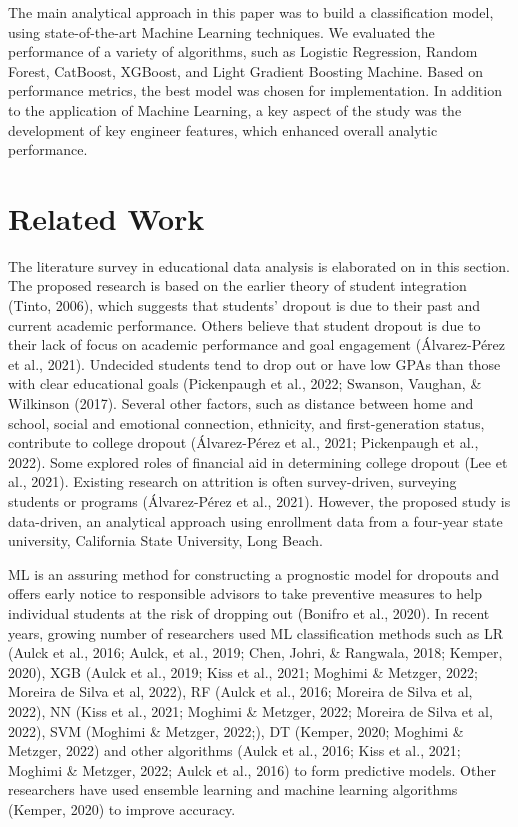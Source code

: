\documentclass[notitlepage,12pt]{jedm}
\begin{document}
\par The main analytical approach in this paper was to build a classification model, using state-of-the-art Machine Learning techniques. We evaluated the performance of a variety of algorithms, such as Logistic Regression, Random Forest, CatBoost, XGBoost, and Light Gradient Boosting Machine. Based on performance metrics, the best model was chosen for implementation. In addition to the application of Machine Learning, a key aspect of the study was the development of key engineer features, which enhanced overall analytic performance.    

\section{Related Work}

\par The literature survey in educational data analysis is elaborated on in this section.  The proposed research is based on the earlier theory of student integration (Tinto, 2006), which suggests that students’ dropout is due to their past and current academic performance.  Others believe that student dropout is due to their lack of focus on academic performance and goal engagement (Álvarez-Pérez et al., 2021).  Undecided students tend to drop out or have low GPAs than those with clear educational goals (Pickenpaugh et al., 2022; Swanson, Vaughan, \& Wilkinson (2017).  Several other factors, such as distance between home and school, social and emotional connection, ethnicity, and first-generation status, contribute to college dropout (Álvarez-Pérez et al., 2021; Pickenpaugh et al., 2022).   Some explored roles of financial aid in determining college dropout (Lee et al., 2021).  Existing research on attrition is often survey-driven, surveying students or programs (Álvarez-Pérez et al., 2021).  However, the proposed study is data-driven, an analytical approach using enrollment data from a four-year state university, California State University, Long Beach.   

\par ML is an assuring method for constructing a prognostic model for dropouts and offers early notice to responsible advisors to take preventive measures to help individual students at the risk of dropping out (Bonifro et al., 2020).  In recent years, growing number of researchers used ML classification methods such as LR (Aulck et al., 2016; Aulck, et al., 2019; Chen, Johri, \& Rangwala, 2018; Kemper, 2020), XGB (Aulck et al., 2019; Kiss et al., 2021; Moghimi \& Metzger, 2022; Moreira de Silva et al, 2022), RF (Aulck et al., 2016; Moreira de Silva et al, 2022), NN (Kiss et al., 2021; Moghimi \& Metzger, 2022; Moreira de Silva et al, 2022), SVM (Moghimi \& Metzger, 2022;), DT (Kemper, 2020; Moghimi \& Metzger, 2022) and other algorithms (Aulck et al., 2016; Kiss et al., 2021; Moghimi \& Metzger, 2022; Aulck et al., 2016) to form predictive models.  Other researchers have used ensemble learning and machine learning algorithms (Kemper, 2020) to improve accuracy.   
\end{document}
